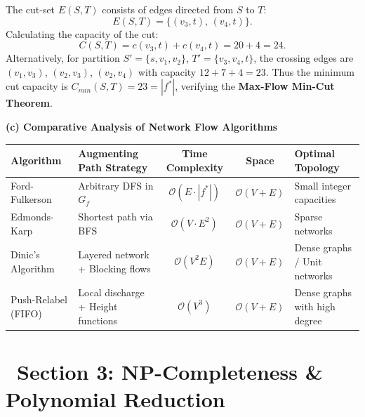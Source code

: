 \documentclass[11pt, a4paper]{article}
\newcommand{\Onotation}[1]{\mathcal{O}\left(#1\right)}
\newcommand{\solsection}[1]{\vspace{2pt}\noindent\textbf{\textcolor{primary}{#1}}\par\vspace{1pt}}
\begin{document}
\begin{solutionbox}
  The cut-set $E(S, T)$ consists of edges directed from $S$ to $T$:
  \begin{equation*}
    E(S, T) = \big\{ (v_3, t),\, (v_4, t) \big\}.
  \end{equation*}
  Calculating the capacity of the cut:
  \begin{equation*}
    C(S, T) = c(v_3, t) + c(v_4, t) = 20 + 4 = 24.
  \end{equation*}
  Alternatively, for partition $S' = \{s, v_1, v_2\}$, $T' = \{v_3, v_4, t\}$, the crossing edges are $(v_1,v_3)$, $(v_2,v_3)$, $(v_2,v_4)$ with capacity $12 + 7 + 4 = 23$.
  Thus the minimum cut capacity is $C_{min}(S, T) = 23 = |f^*|$, verifying the \textbf{Max-Flow Min-Cut Theorem}.

  \solsection{(c) Comparative Analysis of Network Flow Algorithms}

  \begin{center}
    \vspace{2pt}
    \sffamily\small
    \begin{tabularx}{\textwidth}{l X c c l}
      \toprule
      \textbf{Algorithm} & \textbf{Augmenting Path Strategy} & \textbf{Time Complexity} & \textbf{Space} & \textbf{Optimal Topology} \\
      \midrule
      Ford-Fulkerson & Arbitrary DFS in $G_f$ & $\Onotation{E \cdot |f^*|}$ & $\Onotation{V + E}$ & Small integer capacities \\
      Edmonds-Karp & Shortest path via BFS & $\Onotation{V \cdot E^2}$ & $\Onotation{V + E}$ & Sparse networks \\
      Dinic's Algorithm & Layered network + Blocking flows & $\Onotation{V^2 E}$ & $\Onotation{V + E}$ & Dense graphs / Unit networks \\
      Push-Relabel (FIFO) & Local discharge + Height functions & $\Onotation{V^3}$ & $\Onotation{V + E}$ & Dense graphs with high degree \\
      \bottomrule
    \end{tabularx}
  \end{center}
\end{solutionbox}

\vspace{3pt}

\section*{\sffamily\textcolor{primary}{\faCode\ Section 3: NP-Completeness \& Polynomial Reduction}}
\end{document}
